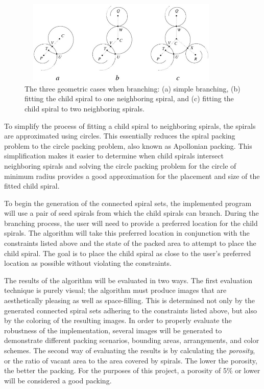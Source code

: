 \documentclass[11pt]{article}
\begin{document}
\begin{figure}[ht]
	\centering
	\includegraphics[width=100mm,height=40mm]{spiral-packing-fig-01}
	\caption{The three geometric cases when branching: (a) simple branching, (b) fitting the child spiral to one neighboring spiral, and (c) fitting the child spiral to two neighboring spirals. \cite{Browne2006834}}
	\label{fig:geo}
\end{figure}

	To simplify the process of fitting a child spiral to neighboring spirals, the spirals are approximated using circles. This essentially reduces the spiral packing problem to the circle packing problem, also known as Apollonian packing. This simplification makes it easier to determine when child spirals intersect neighboring spirals and solving the circle packing problem for the circle of minimum radius provides a good approximation for the placement and size of the fitted child spiral.

	To begin the generation of the connected spiral sets, the implemented program will use a pair of seed spirals from which the child spirals can branch. During the branching process, the user will need to provide a preferred location for the child spirals. The algorithm will take this preferred location in conjunction with the constraints listed above and the state of the packed area to attempt to place the child spiral. The goal is to place the child spiral as close to the user's preferred location as possible without violating the constraints.

	The results of the algorithm will be evaluated in two ways. The first evaluation technique is purely visual; the algorithm must produce images that are aesthetically pleasing as well as space-filling. This is determined not only by the generated connected spiral sets adhering to the constraints listed above, but also by the coloring of the resulting images. In order to properly evaluate the robustness of the implementation, several images will be generated to demonstrate different packing scenarios, bounding areas, arrangements, and color schemes. The second way of evaluating the results is by calculating the \textit{porosity}, or the ratio of vacant area to the area covered by spirals. The lower the porosity, the better the packing. For the purposes of this project, a porosity of 5\% or lower will be considered a good packing. 
	
\end{document}
